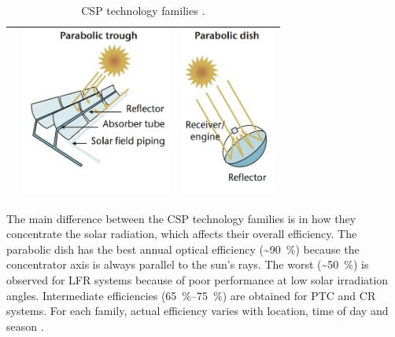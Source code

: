 \begin{table}[h!]
\begin{tabular}{  m{5cm}  m{5cm}  m{5cm}  }
    &
    \begin{minipage}{5cm}
      \centering
	  \includegraphics[height=55mm]{FIG/SUM/PT}
    \end{minipage}
    & 
    \begin{minipage}{5cm}
      \centering
	  \includegraphics[height=55mm]{FIG/SUM/PD}
    \end{minipage}    
    \\ \hline
  \end{tabular}
  \caption[CSP technology families.]{CSP technology families \cite{IEA2014c}.}\label{tbl: CSPtech}
\end{table}


The main difference between the \ac{CSP} technology families is in how they concentrate the solar radiation, which affects their overall efficiency. The parabolic dish has the best annual optical efficiency (\sim\SI{90}{\percent}) because the concentrator axis is always parallel to the sun's rays. The worst (\sim\SI{50}{\percent}) is observed for \ac{LFR} systems because of poor performance at low solar irradiation angles. Intermediate efficiencies (\SIrange{65}{75}{\percent}) are obtained for \ac{PTC} and \ac{CR} systems. For each family, actual efficiency varies with location, time of day and season \cite{EASAC2011}.

